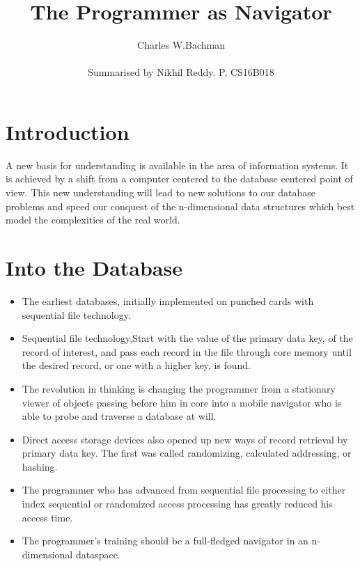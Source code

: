 \documentclass[a4paper]{article}
\title{The Programmer as Navigator}
\author{Charles W.Bachman\\\\Summarised by  Nikhil Reddy. P, CS16B018}
\begin{document}
\maketitle

\section{Introduction}
\hspace{1cm}A new basis for understanding is
available in the area of information systems. It is
achieved by a shift from a computer centered to the
database centered point of view. This new understanding will lead to new solutions to our database problems and speed our conquest of the n-dimensional data structures which best model the complexities of the real world. 

\section{Into the Database}
\begin{itemize}
\item The earliest databases, initially implemented on
punched cards with sequential file technology.
\item Sequential file technology,Start with the value of the primary
data key, of the record of interest, and pass each record
in the file through core memory until the desired record,
or one with a higher key, is found.
\item The revolution in
thinking is changing the programmer from a stationary
viewer of objects passing before him in core into a
mobile navigator who is able to probe and traverse a
database at will.
\item Direct access storage devices also opened up new
ways of record retrieval by primary data key. The first
was called randomizing, calculated addressing, or hashing.
\item The programmer who has advanced from sequential
file processing to either index sequential or randomized
access processing has greatly reduced his access time.
\item The programmer's
training should be a full-fledged navigator in an n-dimensional dataspace.
\end{itemize}
\end{document}
